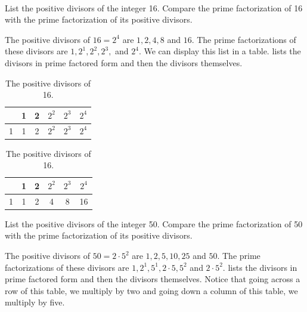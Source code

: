 \begin{exam}
\label{exam_list_divisors_from_prime_fact}
~   
    \begin{apart}
        \item \label{part_list_div16} List the positive divisors of the integer 16. Compare the prime factorization of 16 with the prime factorization of its positive divisors.
            \begin{soln}
                The positive divisors of $16=2^4$ are $1, 2, 4, 8$ and $16$.   The prime factorizations of these divisors are $1, 2^1, 2^2, 2^3,$ and $2^4$.  We can display this list in a table.  lists the divisors in prime factored form and then the divisors themselves. 
            \end{soln}

            \begin{table}[hbtp]
            \centering
                \begin{tabular} {c| |c |c |c |c |c}
                & 1& 2 & $2^2$ & $2^3$ & $2^4$  \\ \hline \hline
                1 & 1& 2 & $2^2$ & $2^3$ & $2^4$ \\ 
                \end{tabular}
                    \hspace{1in}
                \begin{tabular} {c| |c |c |c |c |c}
                & 1& 2 & $2^2$ & $2^3$ & $2^4$   \\ \hline \hline
                1 & 1& 2 & 4 & 8 & 16 \\ 
                \end{tabular}
            \caption{The positive divisors of 16.}
            \label{table_divisors16}
            \end{table}
            
        \item \label{part_list_div50} List the positive divisors of the integer 50. Compare the prime factorization of 50 with the prime factorization of its positive divisors.
            \begin{soln}
                The positive divisors of $50=2\cdot 5^2$ are $1, 2, 5, 10, 25$ and $50$.   The prime factorizations of these divisors are $1, 2^1, 5^1, 2 \cdot 5, 5^2$ and $2\cdot 5^2$.   lists the divisors in prime factored form and then the divisors themselves. Notice that going across a row of this table, we multiply by two and going down a column of this table, we multiply by five. 
            \end{soln}


\end{apart}
\end{exam}
